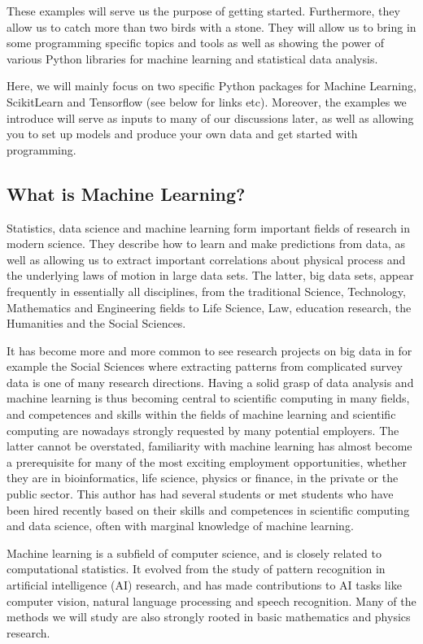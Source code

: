 \documentclass[letterpaper,10pt,english]{sphinxmanual}
\begin{document}
These examples will serve us the purpose of getting
started. Furthermore, they allow us to catch more than two birds with
a stone. They will allow us to bring in some programming specific
topics and tools as well as showing the power of various Python
libraries for machine learning and statistical data analysis.

Here, we will mainly focus on two
specific Python packages for Machine Learning, Scikit\sphinxhyphen{}Learn and
Tensorflow (see below for links etc).  Moreover, the examples we
introduce will serve as inputs to many of our discussions later, as
well as allowing you to set up models and produce your own data and
get started with programming.


\subsection{What is Machine Learning?}
\label{\detokenize{chapter3:what-is-machine-learning}}
Statistics, data science and machine learning form important fields of
research in modern science.  They describe how to learn and make
predictions from data, as well as allowing us to extract important
correlations about physical process and the underlying laws of motion
in large data sets. The latter, big data sets, appear frequently in
essentially all disciplines, from the traditional Science, Technology,
Mathematics and Engineering fields to Life Science, Law, education
research, the Humanities and the Social Sciences.

It has become more
and more common to see research projects on big data in for example
the Social Sciences where extracting patterns from complicated survey
data is one of many research directions.  Having a solid grasp of data
analysis and machine learning is thus becoming central to scientific
computing in many fields, and competences and skills within the fields
of machine learning and scientific computing are nowadays strongly
requested by many potential employers. The latter cannot be
overstated, familiarity with machine learning has almost become a
prerequisite for many of the most exciting employment opportunities,
whether they are in bioinformatics, life science, physics or finance,
in the private or the public sector. This author has had several
students or met students who have been hired recently based on their
skills and competences in scientific computing and data science, often
with marginal knowledge of machine learning.

Machine learning is a subfield of computer science, and is closely
related to computational statistics.  It evolved from the study of
pattern recognition in artificial intelligence (AI) research, and has
made contributions to AI tasks like computer vision, natural language
processing and speech recognition. Many of the methods we will study are also
strongly rooted in basic mathematics and physics research.
\end{document}
